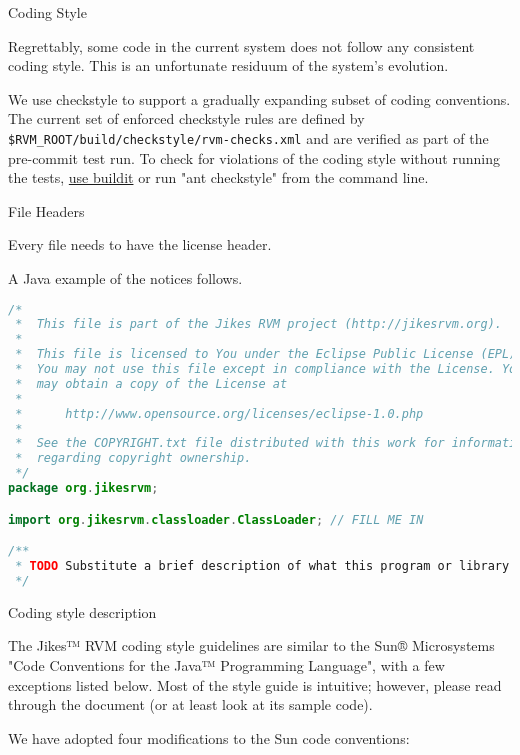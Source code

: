 \begin{section}{Coding Style}
\label{sec:codingstyle}

Regrettably, some code in the current system does not follow any consistent coding style. This is an unfortunate residuum of the system's evolution.

We use checkstyle to support a gradually expanding subset of coding conventions.  The current set of enforced checkstyle rules are defined by \texttt{\$RVM\_ROOT/build/check\-style/rvm-checks.xml} and are verified as part of the pre-commit test run. To check for violations of the coding style without running the tests, \hyperref[sec:usingbuildit]{use buildit} or run "ant checkstyle" from the command line.

\begin{subsection}{File Headers}

Every file needs to have the license header.

A Java example of the notices follows.

\begin{lstlisting}[language=Java]
/*
 *  This file is part of the Jikes RVM project (http://jikesrvm.org).
 *
 *  This file is licensed to You under the Eclipse Public License (EPL);
 *  You may not use this file except in compliance with the License. You
 *  may obtain a copy of the License at
 *
 *      http://www.opensource.org/licenses/eclipse-1.0.php
 *
 *  See the COPYRIGHT.txt file distributed with this work for information
 *  regarding copyright ownership.
 */
package org.jikesrvm;

import org.jikesrvm.classloader.ClassLoader; // FILL ME IN

/**
 * TODO Substitute a brief description of what this program or library does.
 */
\end{lstlisting}

\end{subsection}

\begin{subsection}{Coding style description}

The Jikes™ RVM coding style guidelines are similar to the Sun® Microsystems "Code Conventions for the Java™ Programming Language", with a few exceptions listed below. Most of the style guide is intuitive; however, please read through the document (or at least look at its sample code).

We have adopted four modifications to the Sun code conventions:


\end{subsection}
\end{section}
